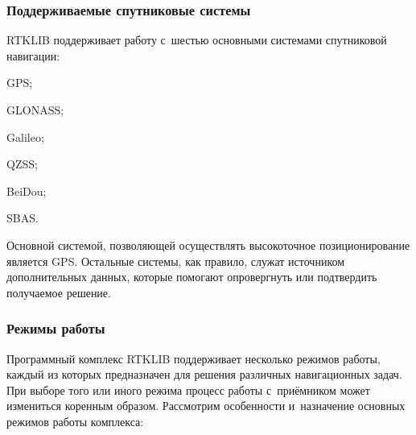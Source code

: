 \subsubsection{Поддерживаемые спутниковые системы}

RTKLIB поддерживает работу с~шестью основными системами спутниковой навигации:

\begin{dashitemize}
  \item GPS;
  \item GLONASS;
  \item Galileo;
  \item QZSS;
  \item BeiDou;
  \item SBAS.
\end{dashitemize}

Основной системой, позволяющей осуществлять высокоточное позиционирование является GPS. Остальные системы, как правило, служат источником дополнительных данных, которые помогают опровергнуть или подтвердить получаемое решение.

\subsubsection{Режимы работы}

Программный комплекс RTKLIB поддерживает несколько режимов работы, каждый из которых предназначен для решения различных навигационных задач. При выборе того или иного режима процесс работы с~приёмником может измениться коренным образом. Рассмотрим особенности и~назначение основных режимов работы комплекса:

